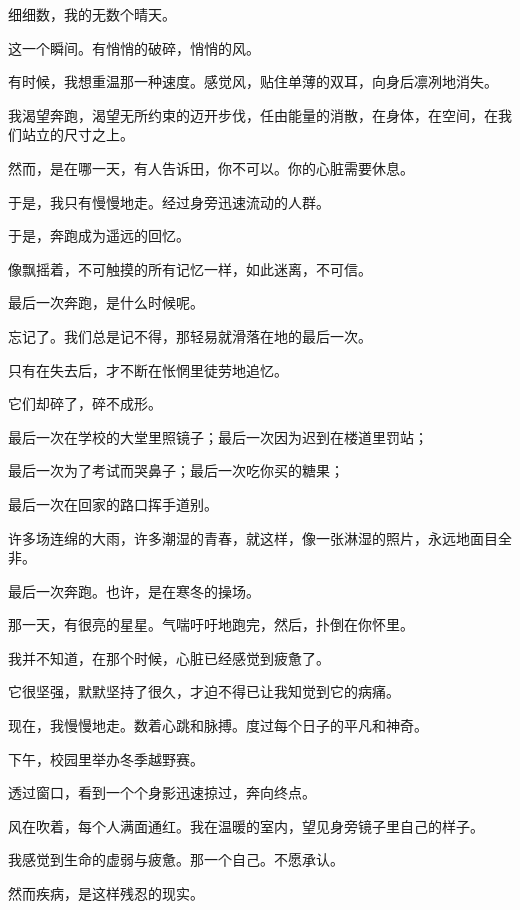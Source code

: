 		细细数，我的无数个晴天。

	\endwriting



		这一个瞬间。有悄悄的破碎，悄悄的风。

		\vspace{1em}
		有时候，我想重温那一种速度。感觉风，贴住单薄的双耳，向身后凛冽地消失。\par
		我渴望奔跑，渴望无所约束的迈开步伐，任由能量的消散，在身体，在空间，在我们站立的尺寸之上。\par
		然而，是在哪一天，有人告诉田，你不可以。你的心脏需要休息。\par
		于是，我只有慢慢地走。经过身旁迅速流动的人群。\par
		于是，奔跑成为遥远的回忆。\par
		像飘摇着，不可触摸的所有记忆一样，如此迷离，不可信。\par
		最后一次奔跑，是什么时候呢。\par
		忘记了。我们总是记不得，那轻易就滑落在地的最后一次。\par
		只有在失去后，才不断在怅惘里徒劳地追忆。\par
		它们却碎了，碎不成形。\par
		最后一次在学校的大堂里照镜子；最后一次因为迟到在楼道里罚站；\par
		最后一次为了考试而哭鼻子；最后一次吃你买的糖果；\par
		最后一次在回家的路口挥手道别。\par
		许多场连绵的大雨，许多潮湿的青春，就这样，像一张淋湿的照片，永远地面目全非。\par
		最后一次奔跑。也许，是在寒冬的操场。\par
		那一天，有很亮的星星。气喘吁吁地跑完，然后，扑倒在你怀里。\par
		我并不知道，在那个时候，心脏已经感觉到疲惫了。\par
		它很坚强，默默坚持了很久，才迫不得已让我知觉到它的病痛。\par
		现在，我慢慢地走。数着心跳和脉搏。度过每个日子的平凡和神奇。\par
		下午，校园里举办冬季越野赛。\par
		透过窗口，看到一个个身影迅速掠过，奔向终点。\par
		风在吹着，每个人满面通红。我在温暖的室内，望见身旁镜子里自己的样子。\par
		我感觉到生命的虚弱与疲惫。那一个自己。不愿承认。\par
		然而疾病，是这样残忍的现实。\par
